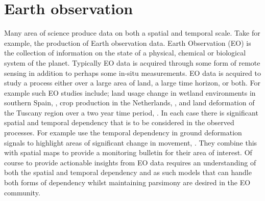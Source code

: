 \section{Earth observation\label{sec:eo}}
Many area of science produce data on both a spatial and temporal scale.
Take for example, the production of Earth observation data. Earth Observation (EO) is the collection of information on the state of a physical, chemical or biological system of the planet.
Typically EO data is acquired through some form of remote sensing in addition to perhaps some in-situ measurements.
EO data is acquired to study a process either over a large area of land, a large time horizon, or both.
For example such EO studies include; land usage change in wetland environments in southern Spain, \citep{muro_short-term_2016}, crop production in the Netherlands, \citep{khabbazan_crop_2019}, and land deformation of the Tuscany region over a two year time period, \citep{raspini_continuous_2018}.
In each case there is significant spatial and temporal dependency that is to be considered in the observed processes.
For example \citeauthor{raspini_continuous_2018} use the temporal dependency in ground deformation signals to highlight areas of significant change in movement, \citep{raspini_continuous_2018}.
They combine this with spatial maps to provide a monitoring bulletin for their area of interest.
Of course to provide actionable insights from EO data requires an understanding of both the spatial and temporal dependency and as such models that can handle both forms of dependency whilst maintaining parsimony are desired in the EO community. 

